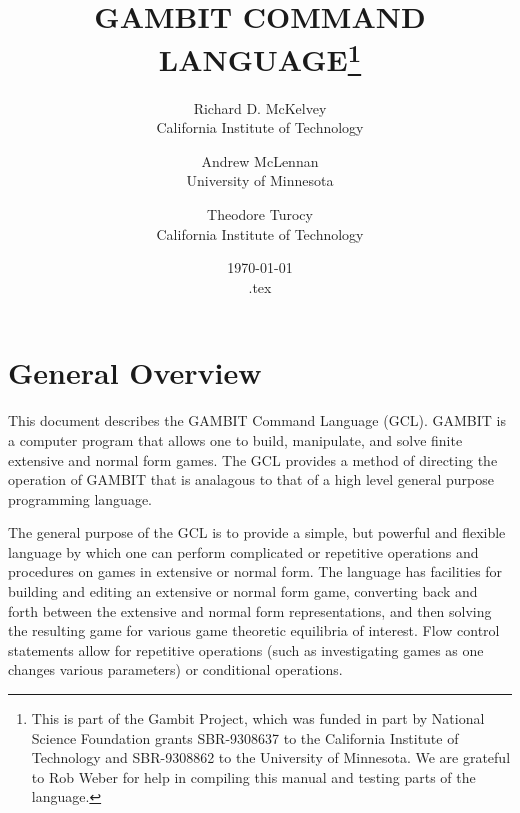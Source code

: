 %
%
%
\renewcommand{\baselinestretch}{.9}
\newcommand{\bd}{\begin{description}}
\newcommand{\ed}{\end{description}}


\title{GAMBIT COMMAND LANGUAGE\thanks{This is part of the Gambit
Project, which was funded in part by National Science Foundation
grants SBR-9308637 to the California Institute of Technology and
SBR-9308862 to the University of Minnesota.  We are grateful to Rob
Weber for help in compiling this manual and testing parts of the
language.}}

\author{Richard D. McKelvey\\California Institute of
Technology
\and
Andrew McLennan\\University of
Minnesota
\and 
Theodore Turocy\\California Institute of Technology
}

\date{\today\\ \jobname.tex}

\maketitle

\tableofcontents

\section{General Overview}

This document describes the GAMBIT Command Language (GCL).  GAMBIT is
a computer program that allows one to build, manipulate, and solve
finite extensive and normal form games. The GCL provides a method of
directing the operation of GAMBIT that is analagous to that of a high
level general purpose programming language.

The general purpose of the GCL is to provide a simple, but powerful
and flexible language by which one can perform complicated or
repetitive operations and procedures on games in extensive or normal
form.  The language has facilities for building and editing an
extensive or normal form game, converting back and forth between the
extensive and normal form representations, and then solving the
resulting game for various game theoretic equilibria of interest. Flow
control statements allow for repetitive operations (such as
investigating games as one changes various parameters) or conditional
operations.

